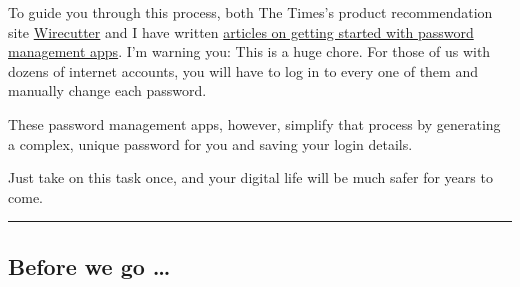 To guide you through this process, both The Times's product
recommendation site
\href{https://www.nytimes.com/wirecutter/blog/why-you-need-a-password-manager-yes-you/}{Wirecutter}
and I have written
\href{https://www.nytimes.com/2016/01/21/technology/personaltech/apps-to-manage-passwords-so-they-are-harder-to-crack-than-password.html}{articles
on getting started with password management apps}. I'm warning you: This
is a huge chore. For those of us with dozens of internet accounts, you
will have to log in to every one of them and manually change each
password.

These password management apps, however, simplify that process by
generating a complex, unique password for you and saving your login
details.

Just take on this task once, and your digital life will be much safer
for years to come.

\begin{center}\rule{0.5\linewidth}{\linethickness}\end{center}

\hypertarget{before-we-go-}{%
\subsection{Before we go \ldots{}}\label{before-we-go-}}


